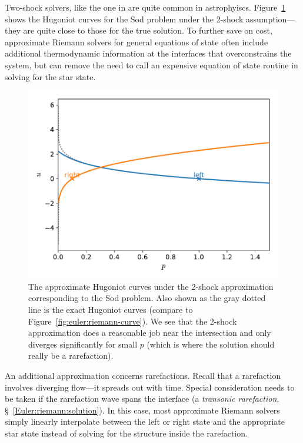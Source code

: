 Two-shock solvers, like the one in \cite{colellaglaz:1985} are quite
common in astrophyiscs.  Figure~\ref{fig:euler:riemann-2shock-curve}
shows the Hugoniot curves for the Sod problem under the 2-shock
assumption---they are quite close to those for the true solution.  To
further save on cost, approximate Riemann solvers for general
equations of state often include additional thermodynamic information
at the interfaces that overconstrains the system, but can remove the
need to call an expensive equation of state routine in solving for the
star state.


\begin{figure}[t]
\centering
\includegraphics[width=0.9\linewidth]{riemann-2shock-sod-phase}
\caption[The approximate (2-shock) Hugoniot curves corresponding to
  the Sod problem]{\label{fig:euler:riemann-2shock-curve} The
  approximate Hugoniot curves under the 2-shock approximation
  corresponding to the Sod problem.  Also shown as the gray dotted
  line is the exact Hugoniot curves (compare to
  Figure~\ref{fig:euler:riemann-curve}).  We see that the 2-shock
  approximation does a reasonable job near the intersection and only
  diverges significantly for small $p$ (which is where the solution
  should really be a
  rarefaction).\\ 
  }
\end{figure}

An additional approximation concerns rarefactions.  Recall that a
rarefaction involves diverging flow---it spreads out with time.
Special consideration needs to be taken if the rarefaction wave spans
the interface (a {\em transonic rarefaction},
\S~\ref{Euler:riemann:solution}).  In this case, most approximate
Riemann solvers simply linearly interpolate between the left or right
state and the appropriate star state instead of solving for the
structure inside the rarefaction.

